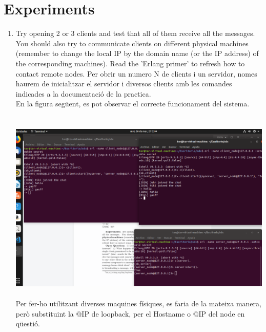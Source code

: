 \documentclass[a4paper, 10pt]{article}
\begin{document}
\section{Experiments}
\begin{enumerate}
  \item Try opening 2 or 3 clients and test that all of them receive all the messages. You should also try to communicate clients on different physical machines (remember to change the local IP by the domain name (or the IP address) of the corresponding machines). Read the ’Erlang primer’ to refresh how to contact remote nodes.
  Per obrir un numero N de clients i un servidor, nomes haurem de inicialitzar el servidor i diversos clients amb les comandes indicades a la documentació de la practica.\\
  En la figura següent, es pot observar el correcte funcionament del sistema.\\\\\\
  \includegraphics[width=\textwidth]{img1}\\\\
  Per fer-ho utilitzant diverses maquines físiques, es faria de la mateixa manera, però substituint la @IP de loopback, per el Hostname o @IP del node en qüestió.



\end{enumerate}
\end{document}
